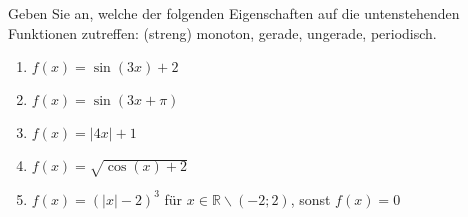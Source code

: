 \item Geben Sie an, welche der folgenden Eigenschaften auf die untenstehenden Funktionen zutreffen: (streng) monoton, gerade, ungerade, periodisch.
\begin{enumerate}
\item $f(x)=\sin(3x)+2$
\item $f(x)=\sin(3x+\pi)$
\item $f(x)= |4x|+1$
\item $f(x)=\sqrt{\cos(x)+2}$
\item $f(x)=( |x|-2)^3$ für $x\in\mathbb{R}\backslash(-2;2)$, sonst $f(x)=0$
\end{enumerate}


